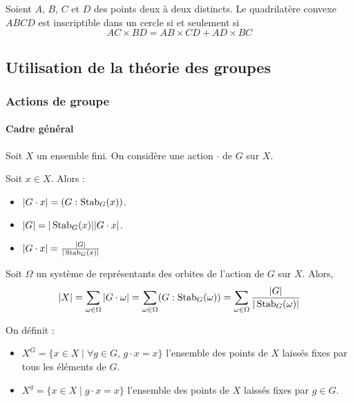   \begin{corollary}
    Soient $A$, $B$, $C$ et $D$ des points deux à deux distincts. Le quadrilatère convexe $ABCD$ est inscriptible dans un cercle si et seulement si
    \[ AC \times BD = AB \times CD + AD \times BC \]
  \end{corollary}

  \subsection{Utilisation de la théorie des groupes}

  \subsubsection{Actions de groupe}

  \paragraph{Cadre général}


  Soit $X$ un ensemble fini. On considère une action $\cdot$ de $G$ sur $X$.

  \begin{proposition}
    Soit $x \in X$. Alors :
    \begin{itemize}
      \item $|G \cdot x| = (G : \operatorname{Stab}_G(x))$.
      \item $|G| = |\operatorname{Stab}_G(x)| |G \cdot x|$.
      \item $|G \cdot x| = \frac{|G|}{|\operatorname{Stab}_G(x)|}$
    \end{itemize}
  \end{proposition}

  \begin{theorem}
    Soit $\Omega$ un système de représentants des orbites de l'action de $G$ sur $X$. Alors,
    \[ |X| = \sum_{\omega \in \Omega} |G \cdot \omega| = \sum_{\omega \in \Omega} (G : \operatorname{Stab}_G(\omega)) = \sum_{\omega \in \Omega} \frac{|G|}{|\operatorname{Stab}_G(\omega)|} \]
  \end{theorem}

  \begin{definition}
    On définit :
    \begin{itemize}
      \item $X^G = \{ x \in X \mid \forall g \in G, \, g \cdot x = x \}$ l'ensemble des points de $X$ laissés fixes par tous les éléments de $G$.
      \item $X^g = \{ x \in X \mid g \cdot x = x \}$ l'ensemble des points de $X$ laissés fixes par $g \in G$.
    \end{itemize}
  \end{definition}

